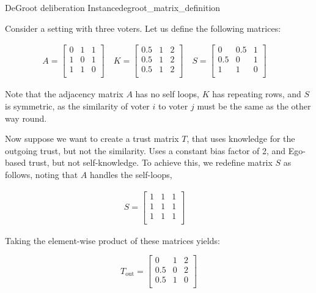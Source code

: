 \begin{example}{DeGroot deliberation Instance}{degroot_matrix_definition}

	Consider a setting with three voters. Let us define the following matrices:

	\begin{align}
		A = \begin{bmatrix}
			    0 & 1 & 1 \\
			    1 & 0 & 1 \\
			    1 & 1 & 0 \\
		    \end{bmatrix} \quad
		K = \begin{bmatrix}
			    0.5 & 1 & 2 \\
			    0.5 & 1 & 2 \\
			    0.5 & 1 & 2 \\
		    \end{bmatrix}\quad
		S = \begin{bmatrix}
			    0   & 0.5 & 1 \\
			    0.5 & 0   & 1 \\
			    1   & 1   & 0 \\
		    \end{bmatrix}\quad
	\end{align}

	Note that the adjacency matrix $A$ has no self loops, $K$ has repeating
	rows, and $S$ is symmetric, as the similarity of voter $i$ to voter $j$
	must be the same as the other way round.

	Now suppose we want to create a trust matrix $T$, that uses knowledge for the
	outgoing trust, but not the similarity. Uses a constant bias
	factor of 2, and Ego-based trust, but not self-knowledge. To achieve
	this, we redefine matrix $S$ as follows, noting that $A$ handles the self-loops,

	\begin{align}
		S = \begin{bmatrix}
			    1 & 1 & 1 \\
			    1 & 1 & 1 \\
			    1 & 1 & 1 \\
		    \end{bmatrix}\quad
	\end{align}

	Taking the element-wise product of these matrices yields:

	$$T_{\text{out}} = \begin{bmatrix}
			0   & 1 & 2 \\
			0.5 & 0 & 2 \\
			0.5 & 1 & 0 \\
		\end{bmatrix}$$


\end{example}
